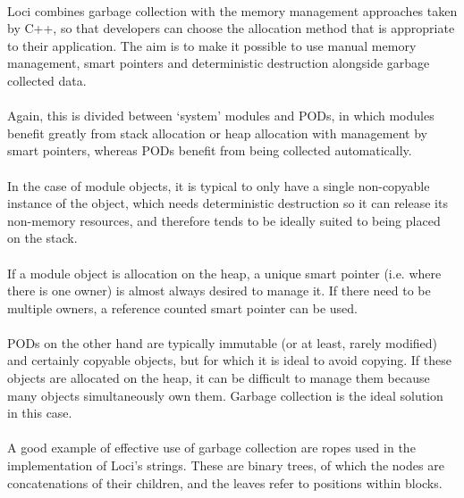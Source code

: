\documentclass[12pt,twoside,notitlepage]{report}
\begin{document}
\paragraph{}
Loci combines garbage collection with the memory management approaches taken by C++, so that developers can choose the allocation method that is appropriate to their application. The aim is to make it possible to use manual memory management, smart pointers and deterministic destruction alongside garbage collected data.

\paragraph{}
Again, this is divided between `system' modules and PODs, in which modules benefit greatly from stack allocation or heap allocation with management by smart pointers, whereas PODs benefit from being collected automatically.

\paragraph{}
In the case of module objects, it is typical to only have a single non-copyable instance of the object, which needs deterministic destruction so it can release its non-memory resources, and therefore tends to be ideally suited to being placed on the stack.

\paragraph{}
If a module object is allocation on the heap, a unique smart pointer (i.e. where there is one owner) is almost always desired to manage it. If there need to be multiple owners, a reference counted smart pointer can be used.

\paragraph{}
PODs on the other hand are typically immutable (or at least, rarely modified) and certainly copyable objects, but for which it is ideal to avoid copying. If these objects are allocated on the heap, it can be difficult to manage them because many objects simultaneously own them. Garbage collection is the ideal solution in this case.

\paragraph{}
A good example of effective use of garbage collection are ropes used in the implementation of Loci's strings. These are binary trees, of which the nodes are concatenations of their children, and the leaves refer to positions within blocks.
\end{document}
